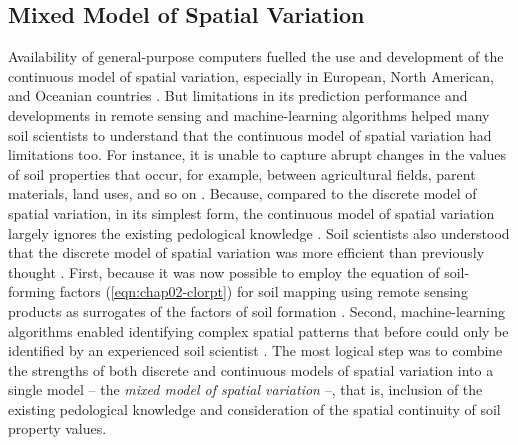 \subsection{Mixed Model of Spatial Variation}

Availability of general-purpose computers fuelled the use and development of the continuous model of spatial 
variation, especially in European, North American, and Oceanian countries \cite{HeuvelinkEtAl2001, 
McBratneyEtAl2003, ScullEtAl2003}. But limitations in its prediction performance and developments in remote 
sensing and machine-learning algorithms helped many soil scientists to understand that the continuous model of
spatial variation had limitations too. For instance, it is unable to capture abrupt changes in the values of 
soil properties that occur, for example, between agricultural fields, parent materials, land uses, and so on
\cite{SteinEtAl1988, VoltzEtAl1990}. Because, compared to the discrete model of spatial variation, in its 
simplest form, the continuous model of spatial variation largely ignores the existing pedological knowledge
\cite{Grunwald2009, Lark2012}. Soil scientists also understood that the discrete model of spatial variation 
was more efficient than previously thought \cite{BregtEtAl1987, HeuvelinkEtAl2001}. First, because it was now
possible to employ the equation of soil-forming factors (\autoref{eqn:chap02-clorpt}) for soil mapping using 
remote sensing products as surrogates of the factors of soil formation \cite{MooreEtAl1993}. Second, 
machine-learning algorithms enabled identifying complex spatial patterns that before could only be identified 
by an experienced soil scientist \cite{McKenzieEtAl1999}. The most logical step was to combine the strengths 
of both discrete and continuous models of spatial variation into a single model -- the \emph{mixed model of 
spatial variation} --, that is, inclusion of the existing pedological knowledge and consideration of the 
spatial continuity of soil property values.

\def\footmixed{\footnote{The use that I give to the expression \emph{mixed model of spatial variation} in this 
thesis is approximately equivalent to expressions such as regression-kriging, kriging with external drift, 
universal kriging, hybrid approach for soil mapping, pedometric mapping, digital soil mapping, predictive soil 
mapping, environmental correlation, geostatistical mapping, soil-landscape modelling, and so on. As far as I 
know, soil spatial modellers have not yet reached an agreement on how these \q{traditional} expressions should 
be used, nor what their \q{correct} meaning is. See, for example, \citeonline{Hengl2003, McBratneyEtAl2003, 
ScullEtAl2003}. Because the expression \emph{mixed model of spatial variation} has a stronger theoretical 
basis (other expressions are defined based on operational aspects), I understand that its adoption and use is 
a more appropriate choice.}}

